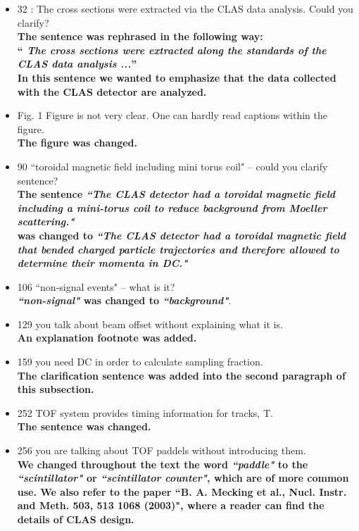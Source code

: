 \documentclass[,superscriptaddress,showpacs,amssymb,amsmath,amsfonts,linenumbers,article]{revtex4-1}
\begin{document}
\begin{itemize}

\item 32 : The cross sections were extracted via the CLAS data analysis. Could you clarify?\\
{\bf The sentence was rephrased in the following way:\\
``\textbf{\textit{ The cross sections were extracted along the standards of the CLAS data analysis ...}}''\\
In this sentence we wanted to emphasize that the data collected with the CLAS detector are analyzed.
}


\item Fig. 1 Figure is not very clear. One can hardly read captions within the figure.\\
{\bf The figure was changed.}

\item 90 ``toroidal magnetic field including mini torus coil" -- could you clarify sentence?\\
{\bf The sentence \textbf{\textit{``The CLAS detector had a toroidal
magnetic field including a mini-torus coil to reduce background from Moeller scattering."}}\\
was changed to \textbf{\textit{``The CLAS detector had a toroidal magnetic field that bended charged particle trajectories and therefore allowed to determine their momenta in DC."}}
}

\item 106 ``non-signal events" -- what is it?\\
{\bf \textbf{\textit{``non-signal"}} was changed to \textbf{\textit{``background"}}}.

\item 129 you talk about beam offset without explaining what it is.\\
{\bf An explanation footnote was added.}

\item 159 you need DC in order to calculate sampling fraction.\\
{\bf The clarification sentence was added into the second paragraph of this subsection.}

\item 252 TOF system provides timing information for tracks, T.\\
{\bf The sentence was changed.}

\item 256 you are talking about TOF paddels without introducing them.\\
{\bf We changed throughout the text the word \textbf{\textit{``paddle"}} to the \textbf{\textit{``scintillator"}} or \textbf{\textit{``scintillator counter"}}, which are of more common use. We also refer to the paper ``B. A. Mecking et al., Nucl. Instr. and Meth. 503, 513
1068 (2003)", where a reader can find the details of CLAS design.}


\end{itemize}
\end{document}
